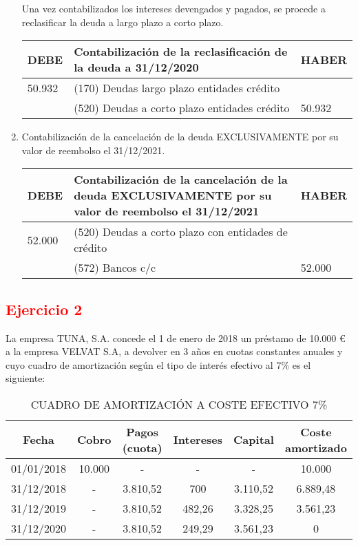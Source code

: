 \begin{enumerate}[label=\alph*)]
Una vez contabilizados los intereses devengados y pagados, se procede a reclasificar la deuda a largo plazo a corto plazo.

\begin{table}[H]
\centering
\begin{tabular}{|p{2cm}|p{8cm}|p{2cm}|}
\hline
\rowcolor{blue!30}
\textbf{DEBE} & \textbf{Contabilización de la reclasificación de la deuda a 31/12/2020} & \textbf{HABER} \\ \hline
50.932 & (170) Deudas largo plazo entidades crédito & \\ \hline
& (520) Deudas a corto plazo entidades crédito & 50.932 \\ \hline
\end{tabular}
\end{table}
\item Contabilización de la cancelación de la deuda EXCLUSIVAMENTE por su valor de reembolso el 31/12/2021.
\begin{table}[H]
\centering
\begin{tabular}{|p{2cm}|p{8cm}|p{2cm}|}
\hline
\rowcolor{blue!30}
\textbf{DEBE} & \textbf{Contabilización de la cancelación de la deuda EXCLUSIVAMENTE por su valor de reembolso el 31/12/2021} & \textbf{HABER} \\ \hline
52.000 & (520) Deudas a corto plazo con entidades de crédito & \\ \hline
& (572) Bancos c/c & 52.000 \\ \hline
\end{tabular}
\end{table}

\end{enumerate}


\newpage
\subsection*{\textcolor{red}{Ejercicio 2}}

La empresa TUNA, S.A. concede el 1 de enero de 2018 un préstamo de 10.000 € a la empresa VELVAT S.A, a devolver en 3 años en cuotas constantes anuales y cuyo cuadro de amortización según el tipo de interés efectivo al 7\% es el siguiente:

\begin{table}[h!]
\centering
\begin{tabular}{|c|c|c|c|c|c|}
\hline
\textbf{Fecha} & \textbf{Cobro} & \textbf{Pagos (cuota)} & \textbf{Intereses} & \textbf{Capital} & \textbf{Coste amortizado} \\ \hline
01/01/2018 & 10.000 & - & - & - & 10.000 \\ \hline
31/12/2018 & - & 3.810,52 & 700 & 3.110,52 & 6.889,48 \\ \hline
31/12/2019 & - & 3.810,52 & 482,26 & 3.328,25 & 3.561,23 \\ \hline
31/12/2020 & - & 3.810,52 & 249,29 & 3.561,23 & 0 \\ \hline
\end{tabular}
\caption{CUADRO DE AMORTIZACIÓN A COSTE EFECTIVO 7\%}
\end{table}

